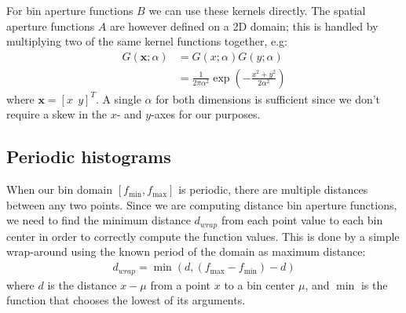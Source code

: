 \documentclass[thesis.tex]{subfiles}
\def\x{\mathbf{x}}
\begin{document}
For bin aperture functions $B$ we can use these kernels directly. The spatial aperture functions $A$ are however defined on a 2D domain; this is handled by multiplying two of the same kernel functions together, e.g:
%
\begin{align*}
G(\x;\alpha) &= G(x;\alpha) G(y;\alpha) \\
&= \frac{1}{2\pi \alpha^2}
\exp\left( -\frac{x^2 + y^2}{2 \alpha^2} \right)
\end{align*}
%
where $\x = [x ~~ y]^T$. A single $\alpha$ for both dimensions is sufficient since we don't require a skew in the $x$- and $y$-axes for our purposes.
%
\subsection{Periodic histograms}
When our bin domain $[f_\text{min}, f_\text{max}]$ is periodic, there are multiple distances between any two points. Since we are computing distance bin aperture functions, we need to find the minimum distance $d_{wrap}$ from each point value to each bin center in order to correctly compute the function values. This is done by a simple wrap-around using the known period of the domain as maximum distance:
\begin{align*}
	d_{wrap} = \min(d,(f_\text{max} - f_\text{min})-d)
\end{align*}
where $d$ is the distance $x - \mu$ from a point $x$ to a bin center $\mu$, and $\min$ is the function that chooses the lowest of its arguments.
\end{document}

